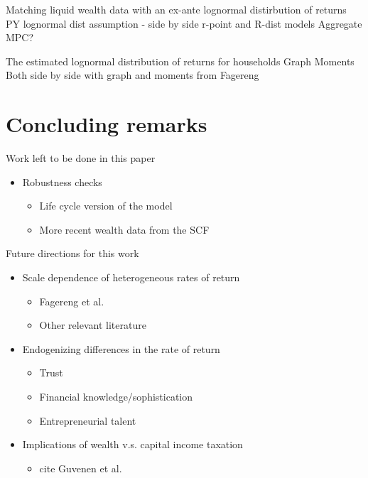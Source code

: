 \documentclass[pdflatex]{beamer}
\begin{document}
\begin{frame}{Matching liquid wealth data with an ex-ante lognormal distirbution of returns}
  PY lognormal dist assumption - side by side r-point and R-dist models
  Aggregate MPC?
\end{frame}

\begin{frame}{The estimated lognormal distribution of returns for households}
  Graph
  Moments
      Both side by side with graph and moments from Fagereng
\end{frame}

\section{Concluding remarks}

\begin{frame}{Work left to be done in this paper}

   \begin{itemize}
    \item Robustness checks 
      \begin{itemize}
      \item Life cycle version of the model
      \item More recent wealth data from the SCF  
      \end{itemize}
   \end{itemize}
  
\end{frame}

\begin{frame}{Future directions for this work}
    \begin{itemize}
    \item Scale dependence of heterogeneous rates of return
      \begin{itemize}
      \item Fagereng et al. 
      \item Other relevant literature  
      \end{itemize}
    \item Endogenizing differences in the rate of return
      \begin{itemize}
      \item Trust
      \item Financial knowledge/sophistication
      \item Entrepreneurial talent  
      \end{itemize}
    \item Implications of wealth v.s. capital income taxation
      \begin{itemize}
        \item cite Guvenen et al. 
      \end{itemize}
    \end{itemize}
\end{frame}

\def\newblock{\hskip .11em plus .33em minus .07em}

\begin{frame}

\renewcommand{\bibsection}{\subsubsection*{\bibname}}

\tiny 


\pagebreak

\end{frame}
\end{document}
